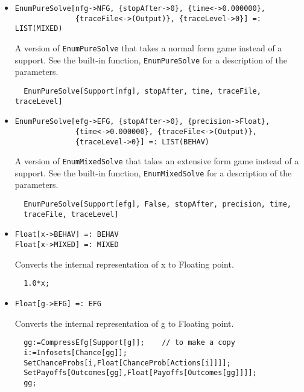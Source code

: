 \begin{itemize}
\item{}
\protect \large \begin{verbatim}
EnumPureSolve[nfg->NFG, {stopAfter->0}, {time<->0.000000}, 
              {traceFile<->(Output)}, {traceLevel->0}] =: LIST(MIXED) 
\end{verbatim}\normalsize

\bd 
A version of \verb+EnumPureSolve+ that takes a normal form game instead
of a support.  See the built-in function, \verb+EnumPureSolve+ for a
description of the parameters.
\begin{verbatim}
  EnumPureSolve[Support[nfg], stopAfter, time, traceFile, traceLevel]
\end{verbatim} 
\ed

\item{}
\protect \large \begin{verbatim}
EnumPureSolve[efg->EFG, {stopAfter->0}, {precision->Float}, 
              {time<->0.000000}, {traceFile<->(Output)}, 
              {traceLevel->0}] =: LIST(BEHAV) 
\end{verbatim}\normalsize

\bd 
A version of \verb+EnumMixedSolve+ that takes an extensive form
game instead of a support.  See the built-in function,
\verb+EnumMixedSolve+ for a description of the parameters.
\begin{verbatim}
  EnumPureSolve[Support[efg], False, stopAfter, precision, time, 
  traceFile, traceLevel]
\end{verbatim} 
\ed


\item{}
\protect \large \begin{verbatim}
Float[x->BEHAV] =: BEHAV 
Float[x->MIXED] =: MIXED 
\end{verbatim}\normalsize

\bd 
Converts the internal representation of x to Floating point.  
\begin{verbatim}
  1.0*x;
\end{verbatim} 
\ed

\item{}
\protect \large \begin{verbatim}
Float[g->EFG] =: EFG 
\end{verbatim}\normalsize

\bd 
Converts the internal representation of g to Floating point.  
\begin{verbatim}
  gg:=CompressEfg[Support[g]];    // to make a copy
  i:=Infosets[Chance[gg]];
  SetChanceProbs[i,Float[ChanceProb[Actions[i]]]];
  SetPayoffs[Outcomes[gg],Float[Payoffs[Outcomes[gg]]]];
  gg;
\end{verbatim} 
\ed


\end{itemize}
